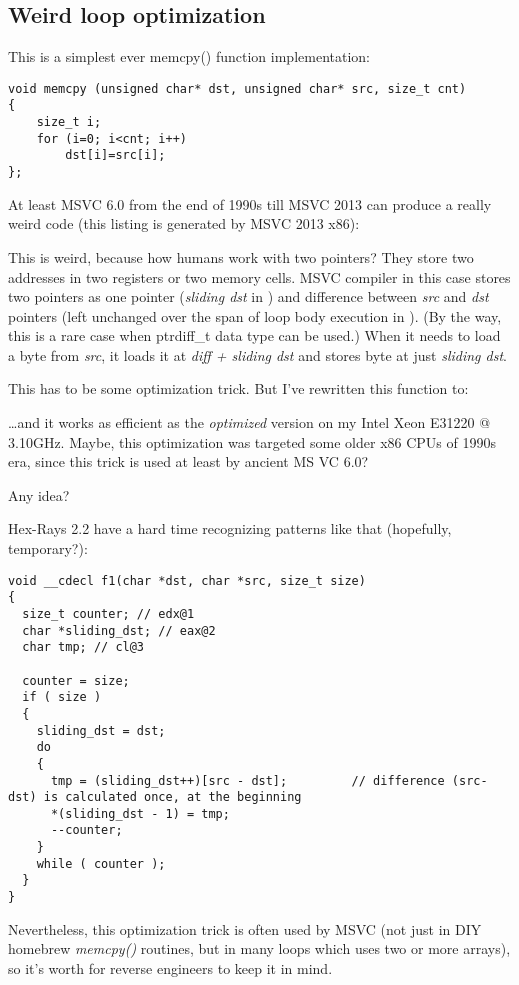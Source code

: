 \subsection{Weird loop optimization}

This is a simplest ever memcpy() function implementation:

\begin{lstlisting}[style=customc]
void memcpy (unsigned char* dst, unsigned char* src, size_t cnt)
{
	size_t i;
	for (i=0; i<cnt; i++)
		dst[i]=src[i];
};
\end{lstlisting}

At least MSVC 6.0 from the end of 1990s till MSVC 2013 can produce a really weird code (this listing is generated by MSVC 2013 x86):



This is weird, because how humans work with two pointers? They store two addresses in two registers or two memory cells.
MSVC compiler in this case stores two pointers as one pointer (\emph{sliding dst} in \EAX) 
and difference between \emph{src} and \emph{dst} pointers (left unchanged over the span of loop body execution in \ESI).
(By the way, this is a rare case when ptrdiff\_t data type can be used.)
When it needs to load a byte from \emph{src}, it loads it at \emph{diff + sliding dst} and stores byte
at just \emph{sliding dst}.

This has to be some optimization trick. But I've rewritten this function to:



\dots and it works as efficient as the \emph{optimized} version on my Intel Xeon E31220 @ 3.10GHz.
Maybe, this optimization was targeted some older x86 CPUs of 1990s era, since this trick is used at least by ancient MS VC 6.0?

Any idea?

Hex-Rays 2.2 have a hard time recognizing patterns like that (hopefully, temporary?):

\begin{lstlisting}[style=customc]
void __cdecl f1(char *dst, char *src, size_t size)
{
  size_t counter; // edx@1
  char *sliding_dst; // eax@2
  char tmp; // cl@3

  counter = size;
  if ( size )
  {
    sliding_dst = dst;
    do
    {
      tmp = (sliding_dst++)[src - dst];         // difference (src-dst) is calculated once, at the beginning
      *(sliding_dst - 1) = tmp;
      --counter;
    }
    while ( counter );
  }
}
\end{lstlisting}

Nevertheless, this optimization trick is often used by MSVC (not just in \ac{DIY} homebrew \emph{memcpy()} routines,
but in many loops which uses two or more arrays),
so it's worth for reverse engineers to keep it in mind.


